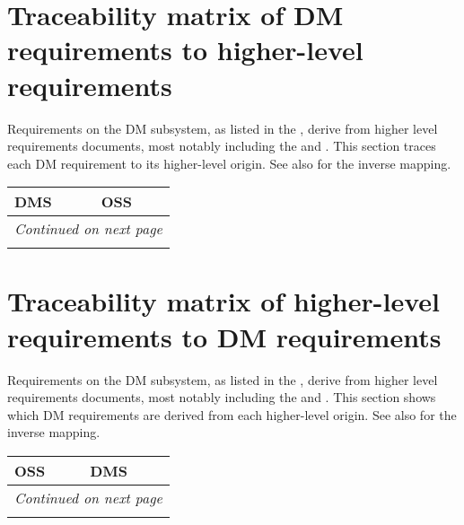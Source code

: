 \newpage
\section{Traceability matrix of DM requirements to higher-level requirements \label{sect:tracefor}}
Requirements on the DM subsystem, as listed in the \DMSR{}, derive from higher level requirements documents, most notably including the \LSR{} and \OSS{}.
This section traces each DM requirement to its higher-level origin.
See also  for the inverse mapping.

\begin{small}
	\begin{longtable}[htb]{|p{}|p{}|} \hline \textbf{DMS} & \textbf{OSS} \\ \hline
\endhead
\hline \multicolumn{2}{r}{\emph{Continued on next page}} \\
\endfoot
\hline\hline
\endlastfoot


\hline
\end{longtable}
\end{small}

\newpage
\section{Traceability matrix of higher-level requirements to DM requirements \label{sect:traceback}}
Requirements on the DM subsystem, as listed in the \DMSR{}, derive from higher level requirements documents, most notably including the \LSR{} and \OSS{}.
This section shows which DM requirements are derived from each higher-level origin.
See also  for the inverse mapping.

\begin{small}
	\begin{longtable}[htb]{|p{}|p{}|} \hline \textbf{OSS} & \textbf{DMS} \\ \hline
\endhead
\hline \multicolumn{2}{r}{\emph{Continued on next page}} \\
\endfoot
\hline\hline
\endlastfoot



\hline
\end{longtable}
\end{small}
